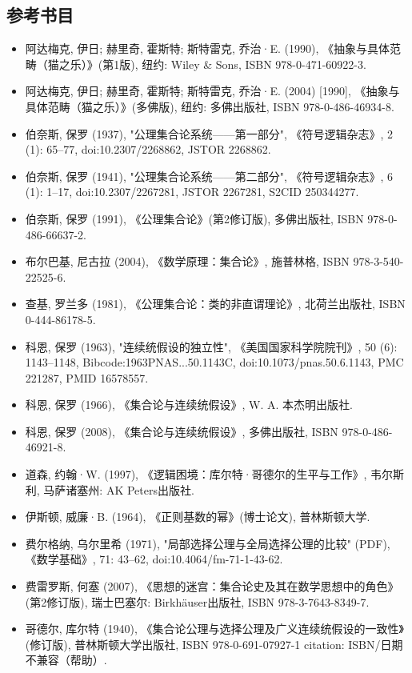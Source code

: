\subsection{参考书目}    
\begin{itemize}
\item 阿达梅克, 伊日; 赫里奇, 霍斯特; 斯特雷克, 乔治·E. (1990), 《抽象与具体范畴（猫之乐）》(第1版), 纽约: Wiley & Sons, ISBN 978-0-471-60922-3.  
\item 阿达梅克, 伊日; 赫里奇, 霍斯特; 斯特雷克, 乔治·E. (2004) [1990], 《抽象与具体范畴（猫之乐）》(多佛版), 纽约: 多佛出版社, ISBN 978-0-486-46934-8.  
\item 伯奈斯, 保罗 (1937), "公理集合论系统——第一部分", 《符号逻辑杂志》, 2 (1): 65–77, doi:10.2307/2268862, JSTOR 2268862.  
\item 伯奈斯, 保罗 (1941), "公理集合论系统——第二部分", 《符号逻辑杂志》, 6 (1): 1–17, doi:10.2307/2267281, JSTOR 2267281, S2CID 250344277.  
\item 伯奈斯, 保罗 (1991), 《公理集合论》(第2修订版), 多佛出版社, ISBN 978-0-486-66637-2.  
\item 布尔巴基, 尼古拉 (2004), 《数学原理：集合论》, 施普林格, ISBN 978-3-540-22525-6.  
\item 查基, 罗兰多 (1981), 《公理集合论：类的非直谓理论》, 北荷兰出版社, ISBN 0-444-86178-5.  
\item 科恩, 保罗 (1963), "连续统假设的独立性", 《美国国家科学院院刊》, 50 (6): 1143–1148, Bibcode:1963PNAS...50.1143C, doi:10.1073/pnas.50.6.1143, PMC 221287, PMID 16578557.  
\item 科恩, 保罗 (1966), 《集合论与连续统假设》, W. A. 本杰明出版社.  
\item 科恩, 保罗 (2008), 《集合论与连续统假设》, 多佛出版社, ISBN 978-0-486-46921-8.  
\item 道森, 约翰·W. (1997), 《逻辑困境：库尔特·哥德尔的生平与工作》, 韦尔斯利, 马萨诸塞州: AK Peters出版社.  
\item 伊斯顿, 威廉·B. (1964), 《正则基数的幂》(博士论文), 普林斯顿大学.  
\item 费尔格纳, 乌尔里希 (1971), "局部选择公理与全局选择公理的比较" (PDF), 《数学基础》, 71: 43–62, doi:10.4064/fm-71-1-43-62.  
\item 费雷罗斯, 何塞 (2007), 《思想的迷宫：集合论史及其在数学思想中的角色》(第2修订版), 瑞士巴塞尔: Birkhäuser出版社, ISBN 978-3-7643-8349-7.  
\item 哥德尔, 库尔特 (1940), 《集合论公理与选择公理及广义连续统假设的一致性》(修订版), 普林斯顿大学出版社, ISBN 978-0-691-07927-1 {{citation}}: ISBN/日期不兼容（帮助）.  

\end{itemize}
